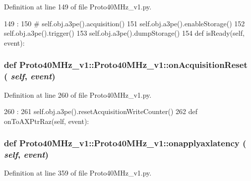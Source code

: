 Definition at line 149 of file Proto40MHz\_\-v1.py.


\begin{DoxyCode}
149                                   :
150 #        self.obj.a3pe().acquisition()
151         self.obj.a3pe().enableStorage()
152         self.obj.a3pe().trigger()
153         self.obj.a3pe().dumpStorage()
154 
    def isReady(self, event):
\end{DoxyCode}
\hypertarget{classProto40MHz__v1_1_1Proto40MHz__v1_aa660e3cb2d6cd99bb0a478c1d41c7a7c}{
\subsubsection[{onAcquisitionReset}]{\setlength{\rightskip}{0pt plus 5cm}def Proto40MHz\_\-v1::Proto40MHz\_\-v1::onAcquisitionReset ( {\em self}, \/   {\em event})}}
\label{classProto40MHz__v1_1_1Proto40MHz__v1_aa660e3cb2d6cd99bb0a478c1d41c7a7c}


Definition at line 260 of file Proto40MHz\_\-v1.py.


\begin{DoxyCode}
260                                        :
261         self.obj.a3pe().resetAcquisitionWriteCounter()
262 
    def onToAXPtrRaz(self, event):
\end{DoxyCode}
\hypertarget{classProto40MHz__v1_1_1Proto40MHz__v1_ae677693512c53fc605ab4da329280d25}{
\subsubsection[{onapplyaxlatency}]{\setlength{\rightskip}{0pt plus 5cm}def Proto40MHz\_\-v1::Proto40MHz\_\-v1::onapplyaxlatency ( {\em self}, \/   {\em event})}}
\label{classProto40MHz__v1_1_1Proto40MHz__v1_ae677693512c53fc605ab4da329280d25}


Definition at line 359 of file Proto40MHz\_\-v1.py.


